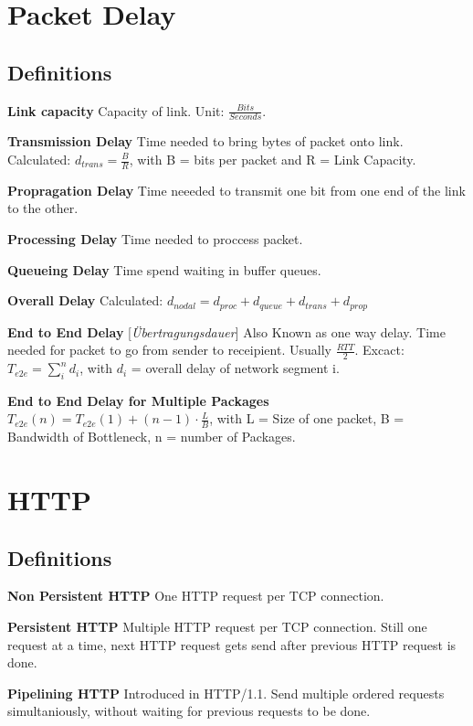 \documentclass{article}
\begin{document}
\section{Packet Delay}
\subsection{Definitions}
\textbf{Link capacity}
Capacity of link. Unit: $\frac{Bits}{Seconds}$.

\textbf{Transmission Delay}
Time needed to bring bytes of packet onto link. Calculated: $d_{trans} = \frac{B}{R}$, with B = bits per packet and R = Link Capacity.

\textbf{Propragation Delay}
Time neeeded to transmit one bit from one end of the link to the other. 

\textbf{Processing Delay}
Time needed to proccess packet.

\textbf{Queueing Delay}
Time spend waiting in buffer queues.

\textbf{Overall Delay}
Calculated: $d_{nodal} = d_{proc} + d_{queue} + d_{trans} + d_{prop}$

\begin{flushleft}
	\textbf{End to End Delay} [\textit{Übertragungsdauer}]\linebreak
	Also Known as one way delay. Time needed for packet to go from sender to receipient. Usually $\frac{RTT}{2}$. Excact: $T_{e2e} = \sum\limits_{i}^{n} d_{i}$, with $d_{i}$ = overall delay of network segment i. 
\end{flushleft}


\textbf{End to End Delay for Multiple Packages}
$T_{e2e}(n) = T_{e2e}(1) + (n-1) \cdot \frac{L}{B}$, with L = Size of one packet, B = Bandwidth of Bottleneck, n = number of Packages.

\section{HTTP}
\subsection{Definitions}
\textbf{Non Persistent HTTP}
One HTTP request per TCP connection.

\textbf{Persistent HTTP}
Multiple HTTP request per TCP connection. Still one request at a time, next HTTP request gets send after previous HTTP request is done.

\textbf{Pipelining HTTP}
Introduced in HTTP/1.1. Send multiple ordered requests simultaniously, without waiting for previous requests to be done.
\end{document}
